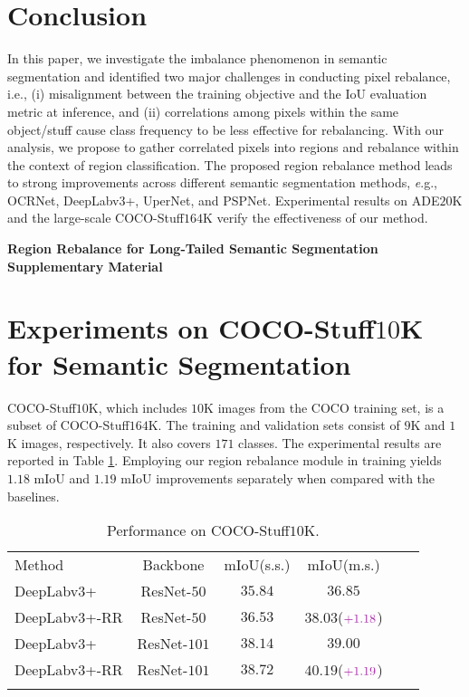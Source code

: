 \documentclass[final]{cvpr}
\begin{document}
\section{Conclusion}
\vspace{-0.1in}
In this paper, we investigate the imbalance phenomenon in semantic segmentation and identified two major challenges in conducting pixel rebalance, {i.e.}, (i) misalignment between the training objective and the $\mathrm{IoU}$ evaluation metric at inference, and (ii) correlations among pixels within the same object/stuff cause class frequency to be less effective for rebalancing. With our analysis, we propose to gather correlated pixels into regions and rebalance within the context of region classification. The proposed region rebalance method leads to strong improvements across different semantic segmentation methods, {\textit e.g.}, OCRNet, DeepLabv$3$+, UperNet, and PSPNet. Experimental results on ADE$20$K and the large-scale COCO-Stuff$164$K verify the effectiveness of our method. 


{\small


}


\newpage
\onecolumn
\appendix

\begin{center}
	\Large \textbf{Region Rebalance for Long-Tailed Semantic Segmentation}
	\Large \\ \textbf{Supplementary Material}
\end{center}
\vspace{20pt}


\section{Experiments on COCO-Stuff$10$K for Semantic Segmentation}
\noindent COCO-Stuff$10$K, which includes $10$K images from the COCO training set, is a subset of COCO-Stuff$164$K. The training and validation sets consist of $9$K and $1$K images, respectively. It also covers $171$ classes. The experimental results are reported in Table \ref{tab:main_cocostuff10k}.
Employing our region rebalance module in training yields $1.18$ $\mathrm{mIoU}$ and $1.19$ $\mathrm{mIoU}$ improvements separately when compared with the baselines.

\begin{table}[h]
	\centering
	\setlength{\tabcolsep}{20.0pt}
	\caption{Performance on COCO-Stuff$10$K.}
	\label{tab:main_cocostuff10k}
{
		\begin{tabular}{l|ccccc}
			\shline
			Method &Backbone  &$\mathrm{mIoU}$(s.s.) &$\mathrm{mIoU}$(m.s.) \\
			\shline
			DeepLabv$3$+         &ResNet-$50$  &$35.84$ &$36.85$                 \\
			DeepLabv$3$+-RR      &ResNet-$50$  &$36.53$ &$38.03$($\textcolor{mylight}{+1.18}$) \\
            DeepLabv$3$+         &ResNet-$101$ &$38.14$ &$39.00$                 \\
			DeepLabv$3$+-RR      &ResNet-$101$ &$38.72$ &$40.19$($\textcolor{mylight}{+1.19}$) \\
			\shline
		\end{tabular}
	}
\end{table}
\end{document}
